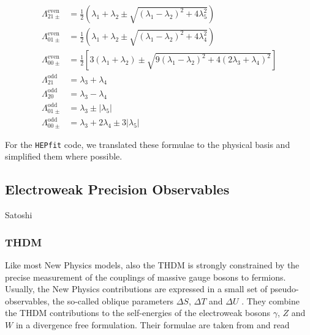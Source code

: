 \documentclass[aps,superscriptaddress,nofootinbib,floatfix,notitlepage]{revtex4-1}
\newcommand{\HEPfit}{\texttt{HEPfit}\xspace}
\begin{document}
\begin{align}
 \Lambda _{21\pm}^{\text{even}} &= \frac12 \left( \lambda_1 +\lambda_2 \pm \sqrt{(\lambda_1-\lambda_2)^2+4\lambda_5^2}\right) \nonumber \\
 \Lambda _{01\pm}^{\text{even}} &= \frac12 \left( \lambda_1 +\lambda_2 \pm \sqrt{(\lambda_1-\lambda_2)^2+4\lambda_4^2}\right) \nonumber \\
 \Lambda _{00\pm}^{\text{even}} &= \frac12 \left[ 3\left( \lambda_1 +\lambda_2 \right) \pm \sqrt{9(\lambda_1-\lambda_2)^2+4(2\lambda_3+\lambda_4)^2}\right] \nonumber \\
 \Lambda _{21}^{\text{odd}} &= \lambda_3 + \lambda_4\nonumber \\
 \Lambda _{20}^{\text{odd}} &= \lambda_3 - \lambda_4\nonumber \\
 \Lambda _{01\pm}^{\text{odd}} &= \lambda_3 \pm |\lambda_5|\nonumber \\
 \Lambda _{00\pm}^{\text{odd}} &= \lambda_3 + 2\lambda_4 \pm 3 |\lambda_5|\nonumber
\end{align}

For the \HEPfit code, we translated these formulae to the physical basis and simplified them where possible.

\subsection{Electroweak Precision Observables}
\label{sec:EWPO}

Satoshi

\subsubsection{THDM}

Like most New Physics models, also the THDM is strongly constrained by the precise measurement of the couplings of massive gauge bosons to fermions. Usually, the New Physics contributions are expressed in a small set of pseudo-observables, the so-called oblique parameters $\Delta S$, $\Delta T$ and $\Delta U$ \cite{Peskin:1990zt,Peskin:1991sw}. They combine the THDM contributions to the self-energies of the electroweak bosons $\gamma$, $Z$ and $W$ in a divergence free formulation. Their formulae are taken from \cite{Haber:1993wf} and read
\end{document}

